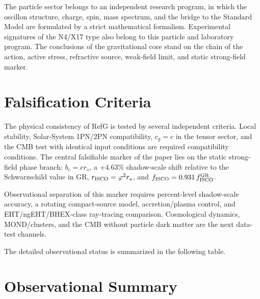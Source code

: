 \documentclass[12pt]{article}
\begin{document}
The particle sector belongs to an independent research program, in which the oscillon structure, charge, spin, mass spectrum, and the bridge to the Standard Model are formulated by a strict mathematical formalism. Experimental signatures of the N4/X17 type also belong to this particle and laboratory program. The conclusions of the gravitational core stand on the chain of the action, active stress, refractive source, weak-field limit, and static strong-field marker.

\section{Falsification Criteria}

The physical consistency of RefG is tested by several independent criteria. Local stability, Solar-System 1PN/2PN compatibility, $c_g=c$ in the tensor sector, and the CMB test with identical input conditions are required compatibility conditions. The central falsifiable marker of the paper lies on the static strong-field phase branch: $b_c=e r_s$, a $+4.63\%$ shadow-scale shift relative to the Schwarzschild value in GR, $r_{\rm ISCO}=\varphi^2r_s$, and $f_{\rm ISCO}=0.931\,f_{\rm ISCO}^{\rm GR}$.

Observational separation of this marker requires percent-level shadow-scale accuracy, a rotating compact-source model, accretion/plasma control, and EHT/ngEHT/BHEX-class ray-tracing comparison. Cosmological dynamics, MOND/clusters, and the CMB without particle dark matter are the next data-test channels.

The detailed observational status is summarized in the following table.

\section{Observational Summary}
\end{document}

